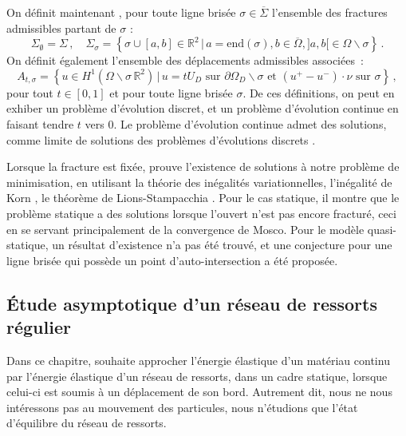 On définit maintenant \parencite[p.50]{balasoiu2020halthesis}, pour toute ligne brisée $\sigma \in  \overline{\Sigma}$ l’ensemble des fractures admissibles partant de $\sigma$ :
$$
\Sigma_{\emptyset} = \Sigma \,, \quad \Sigma_{\sigma} = \left\{ \sigma \cup [a,b] \in \mathbb{R}^2 \, \lvert \, a = \text{end}(\sigma), b\in \overline{\Omega}, ]a,b[ \in \Omega\backslash \sigma \right\} \,.
$$
On définit également l'ensemble des déplacements admissibles associées :
$$
A_{t,\sigma} = \left\{  u \in H^1(\Omega \backslash \sigma \, \mathbb{R}^2) \, \rvert \, u=tU_D \text{ sur } \partial \Omega_D \backslash \sigma \text{ et } (u^+ - u^{-}) \cdot \nu \text{ sur } \sigma \right\} \,,
$$
pour tout $t \in [0,1]$ et pour toute ligne brisée $\sigma$. De ces définitions, on peut en exhiber un problème d'évolution discret, et un problème d'évolution continue en faisant tendre $t$ vers $0$. Le problème d’évolution continue admet des solutions, comme limite de solutions des problèmes d’évolutions discrets \parencite{dal2002model, chambolle2003density}.

Lorsque la fracture est fixée, \citeauthor{balasoiu2020halthesis} prouve l’existence de solutions à notre problème de minimisation, en utilisant la théorie des inégalités variationnelles, l'inégalité de Korn \parencite{ciarlet1988three}, le théorème de Lions-Stampacchia \parencite{lions1967variational}. Pour le cas statique, il montre que le problème statique a des solutions lorsque l’ouvert n’est pas encore fracturé, ceci en se servant principalement de la convergence de Mosco. Pour le modèle quasi-statique, un résultat d'existence n'a pas été trouvé, et une conjecture pour une ligne brisée qui possède un point d'auto-intersection a été proposée.



\subsection{Étude asymptotique d’un réseau de ressorts régulier} 

Dans ce chapitre, \citeauthor{balasoiu2020halthesis} souhaite approcher l’énergie élastique d’un matériau continu par l’énergie élastique d’un réseau de ressorts, dans un cadre statique, lorsque celui-ci est soumis à un déplacement de son bord. Autrement dit, nous ne nous intéressons pas au mouvement des particules, nous n’étudions que l’état d’équilibre du réseau de ressorts.

